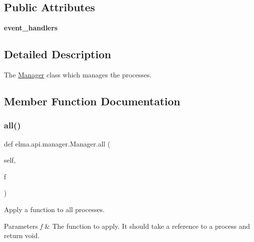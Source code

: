 \subsection*{Public Attributes}
\begin{DoxyCompactItemize}
\item 
\mbox{\label{classelma_1_1api_1_1manager_1_1Manager_a7ec673d8f79675c813f7a5aca8adab8d}} 
{\bfseries event\+\_\+handlers}
\end{DoxyCompactItemize}


\subsection{Detailed Description}
The \hyperlink{classelma_1_1api_1_1manager_1_1Manager}{Manager} class which manages the processes. 



\subsection{Member Function Documentation}
\mbox{\label{classelma_1_1api_1_1manager_1_1Manager_a4e451c5cd548a0086536fa9c990b338e}} 
\subsubsection{\texorpdfstring{all()}{all()}}
{\footnotesize\ttfamily def elma.\+api.\+manager.\+Manager.\+all (\begin{DoxyParamCaption}\item[{}]{self,  }\item[{}]{f }\end{DoxyParamCaption})}



Apply a function to all processes. 


\begin{DoxyParams}{Parameters}
{\em f} & The function to apply. It should take a reference to a process and return void. \\
\hline
\end{DoxyParams}
\mbox{\label{classelma_1_1api_1_1manager_1_1Manager_ad26dad0553c0e6936acbedba79b38bda}} 
